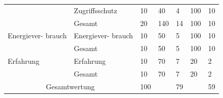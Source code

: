 \begin{tabular}{| p{2.2cm} |  p{2.2cm} | p{1.4cm} |  p{1.4cm} | p{1.4cm} | p{1.4cm} | p{1.4cm} | }
        \cline{2 -7}
        \cellcolor{gray} &\cellcolor{lightgray}\color{white}\small Zugriffsschutz & 10 & 40 & 4 & 100 & 10 \\
        \cline{2 -7}
        \cellcolor{gray} &\cellcolor{lightgray}\color{white}Gesamt & \cellcolor{lightgray}\color{white}20 & \cellcolor{lightgray}\color{white}140 & \cellcolor{lightgray}\color{white}14 & \cellcolor{lightgray}\color{white}100 & \cellcolor{lightgray}\color{white}10\\
        \cline{2 -7}
        \cellcolor{gray}\color{white}Energiever- brauch&\cellcolor{lightgray}\color{white}Energiever- brauch & 10 & 50 & 5 & 100 & 10 \\
        \cline{2 -7}
        \cellcolor{gray} &\cellcolor{lightgray}\color{white}Gesamt & \cellcolor{lightgray}\color{white}10 & \cellcolor{lightgray}\color{white}50 & \cellcolor{lightgray}\color{white}5 & \cellcolor{lightgray}\color{white}100 & \cellcolor{lightgray}\color{white}10\\
        \cline{2 -7}
        \cellcolor{gray}\color{white}Erfahrung&\cellcolor{lightgray}\color{white}Erfahrung & 10 & 70 & 7 & 20 & 2 \\
        \cline{2 -7}
        \cellcolor{gray} &\cellcolor{lightgray}\color{white}Gesamt & \cellcolor{lightgray}\color{white}10 & \cellcolor{lightgray}\color{white}70 & \cellcolor{lightgray}\color{white}7 & \cellcolor{lightgray}\color{white}20 & \cellcolor{lightgray}\color{white}2\\
        \cline{2 -7}
        \multicolumn{2}{|c|}{\cellcolor{gray}\color{white}Gesamtwertung} & 100 & \multicolumn{2}{|r|}{79} & \multicolumn{2}{|r|}{59}\\
        \hline
    \end{tabular} 

